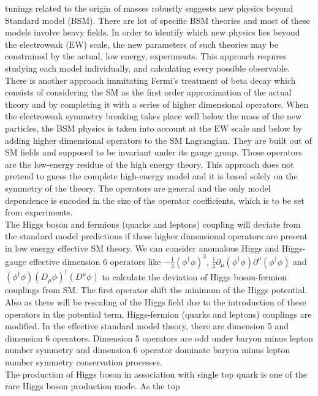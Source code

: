 \documentclass[final,3p]{CSP}
\begin{document}
tunings related to the origin of 
masses robustly suggests new physics beyond Standard model (BSM). There are lot of specific 
BSM theories and most of these 
models involve heavy fields. In order to identify which new physics lies beyond the 
electroweak (EW) scale, the new parameters 
of such theories may be constrained by the actual, low energy, experiments. This approach 
requires studying each model 
individually, and calculating every possible observable. There is another approach immitating 
Fermi's treatment of beta decay 
which consists of considering the SM as the first order approximation of the actual theory 
and by completing it with a series 
of higher dimensional operators. When the electroweak symmetry breaking takes place well 
below the mass of the new particles, 
the BSM physics is taken into account at the EW scale and below by adding higher dimensional 
operators to the SM Lagrangian. 
They are built out of SM fields and supposed to be invariant under its gauge group. Those 
operators are the low-energy residue 
of the high energy theory. This approach does not pretend to guess the complete high-energy 
model and it is based solely on 
the symmetry of the  theory. The operators are general and the only model dependence is 
encoded in the size of the operator 
coefficients, which is to be set from experiments. \\
The Higgs boson and fermions (quarks and leptons) coupling will deviate from the standard 
model predictions if these higher 
dimensional operators are present in low energy effective SM theory. We can consider 
anomalous Higgs and Higgs-gauge effective 
dimension 6 operators like $-\frac{1}{3}(\phi^{\dagger}\phi)^3$, $\frac{1}{2} \partial_{\mu} 
(\phi^{\dagger} \phi) 
\partial^{\mu}(\phi^{\dagger} \phi)$ and $(\phi^{\dagger} \phi)(D_{\mu} \phi)^{\dagger} 
(D^{\mu} \phi)$ to calculate the 
deviation of Higgs boson-fermion couplings from SM. The first operator shift the minimum of 
the Higgs potential. Also as there 
will be rescaling of the Higgs field due to the introduction of these operators in the 
potential term, Higgs-fermion (quarks 
and leptons) couplings are modified. In the effective standard model theory, there are 
dimension 5 and dimension 6 
operators. Dimension 5 operators are odd under baryon minus lepton number symmetry and 
dimension 6 operator dominate baryon 
minus lepton number symmetry conservation processes. \\
The production of Higgs boson in association with single top quark is one of the rare Higgs 
boson production mode. As the top 
\end{document}
